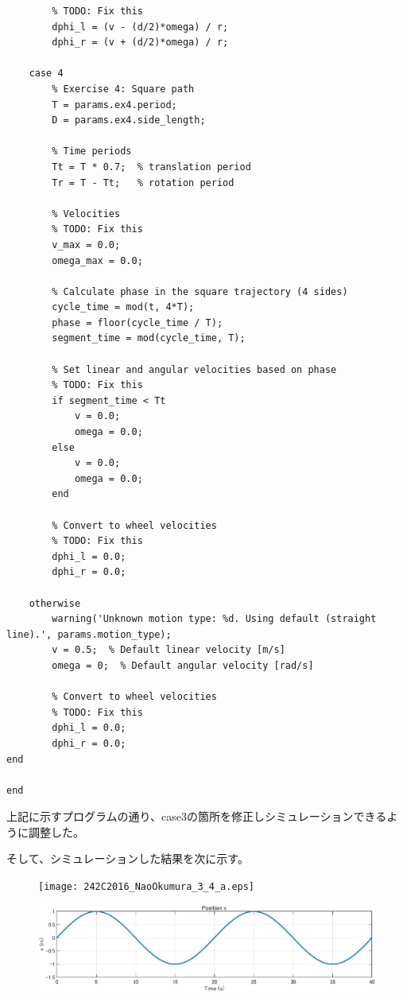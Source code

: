 \documentclass[10pt,a4paper,titlepage]{jreport} %
\begin{document}
\begin{lstlisting}[caption=modified＿mobile＿robot＿controller.m]
        % Convert to wheel velocities
        % TODO: Fix this
        dphi_l = (v - (d/2)*omega) / r;
        dphi_r = (v + (d/2)*omega) / r;
        
    case 4
        % Exercise 4: Square path
        T = params.ex4.period;
        D = params.ex4.side_length;
        
        % Time periods
        Tt = T * 0.7;  % translation period
        Tr = T - Tt;   % rotation period
        
        % Velocities
        % TODO: Fix this
        v_max = 0.0;
        omega_max = 0.0;
        
        % Calculate phase in the square trajectory (4 sides)
        cycle_time = mod(t, 4*T);
        phase = floor(cycle_time / T);
        segment_time = mod(cycle_time, T);
        
        % Set linear and angular velocities based on phase
        % TODO: Fix this
        if segment_time < Tt
            v = 0.0;
            omega = 0.0;
        else
            v = 0.0;
            omega = 0.0;
        end
        
        % Convert to wheel velocities
        % TODO: Fix this
        dphi_l = 0.0;
        dphi_r = 0.0;
        
    otherwise
        warning('Unknown motion type: %d. Using default (straight line).', params.motion_type);
        v = 0.5;  % Default linear velocity [m/s]
        omega = 0;  % Default angular velocity [rad/s]
        
        % Convert to wheel velocities
        % TODO: Fix this
        dphi_l = 0.0;
        dphi_r = 0.0;
end

end

\end{lstlisting}

上記に示すプログラムの通り、case3の箇所を修正しシミュレーションできるように調整した。

そして、シミュレーションした結果を次に示す。

\begin{figure}[H] %
  \centering
  \texttt{[image: 242C2016\_NaoOkumura\_3\_4\_a.eps]} %
\end{figure}

\begin{figure}[H] %
  \centering
  \includegraphics[width=0.6\linewidth]{242C2016_NaoOkumura_3_4_b.eps} %
\end{figure}
\end{document}
